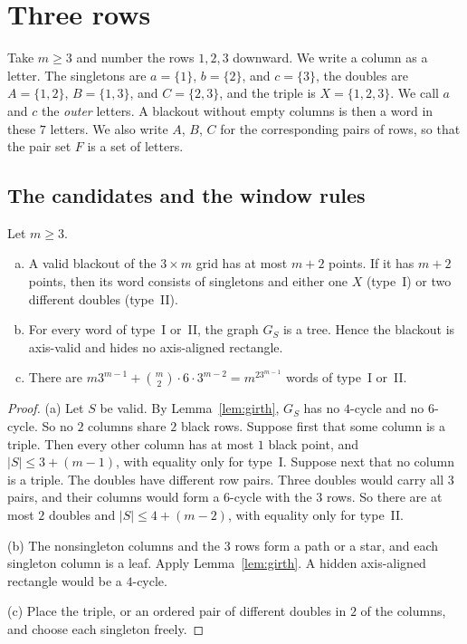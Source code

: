 \section{Three rows}\label{sec:three}

Take $m\ge3$ and number the rows $1,2,3$ downward. We write a column as a
letter. The singletons are $a=\{1\}$, $b=\{2\}$, and $c=\{3\}$, the doubles are
$A=\{1,2\}$, $B=\{1,3\}$, and $C=\{2,3\}$, and the triple is $X=\{1,2,3\}$. We
call $a$ and $c$ the \emph{outer} letters. A blackout without empty columns is
then a word in these $7$ letters. We also write $A$, $B$, $C$ for the
corresponding pairs of rows, so that the pair set $F$ is a set of letters.

\subsection{The candidates and the window rules}

\begin{proposition}\label{prop:threeclass}
Let $m\ge3$.
\begin{enumerate}[(a)]
\item A valid blackout of the $3\times m$ grid has at most $m+2$ points. If it has
$m+2$ points, then its word consists of singletons and either one $X$
\textup{(type~I)} or two different doubles \textup{(type~II)}.
\item For every word of type~I or~II, the graph $G_S$ is a tree. Hence the
blackout is axis-valid and hides no axis-aligned rectangle.
\item There are $m3^{m-1}+\binom m2\cdot6\cdot3^{m-2}=m^23^{m-1}$ words of type~I
or~II.
\end{enumerate}
\end{proposition}

\begin{proof}
(a) Let $S$ be valid. By Lemma~\ref{lem:girth}, $G_S$ has no $4$-cycle and no
$6$-cycle. So no $2$ columns share $2$ black rows. Suppose first that some
column is a triple. Then every other column has at most $1$ black point, and
$|S|\le3+(m-1)$, with equality only for type~I. Suppose next that no column is a
triple. The doubles have different row pairs. Three doubles would carry
all $3$ pairs, and their columns would form a $6$-cycle with the $3$ rows. So
there are at most $2$ doubles and $|S|\le4+(m-2)$, with equality only for
type~II.

(b) The nonsingleton columns and the $3$ rows form a path or a star, and each
singleton column is a leaf. Apply Lemma~\ref{lem:girth}. A hidden axis-aligned
rectangle would be a $4$-cycle.

(c) Place the triple, or an ordered pair of different doubles in $2$ of the
columns, and choose each singleton freely.
\end{proof}


